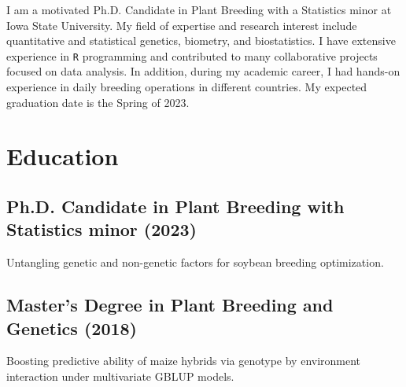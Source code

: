 \documentclass[]{mdkrause_cv_openfont}
\begin{document}
%
%

%
%

%
%

\begin{minipage}[t]{1\textwidth} 


\vspace{1 mm}

I am a motivated Ph.D. Candidate in Plant Breeding with a Statistics minor at Iowa State University. My field of expertise and research interest include quantitative and statistical genetics, biometry, and biostatistics. I have extensive experience in \texttt{R} programming and contributed to many collaborative projects focused on data analysis. In addition, during my academic career, I had hands-on experience in daily breeding operations in different countries. My expected graduation date is the Spring of 2023.



\section{Education} 

\sectionsep

\subsection{Ph.D. Candidate in Plant Breeding with Statistics minor (2023)}
 Untangling genetic and non-genetic factors for soybean breeding optimization.
\sectionsep

\subsection{Master's Degree in Plant Breeding and Genetics (2018)}
 Boosting predictive ability of maize hybrids via genotype by environment interaction under multivariate GBLUP models.


\end{minipage}
\end{document}
